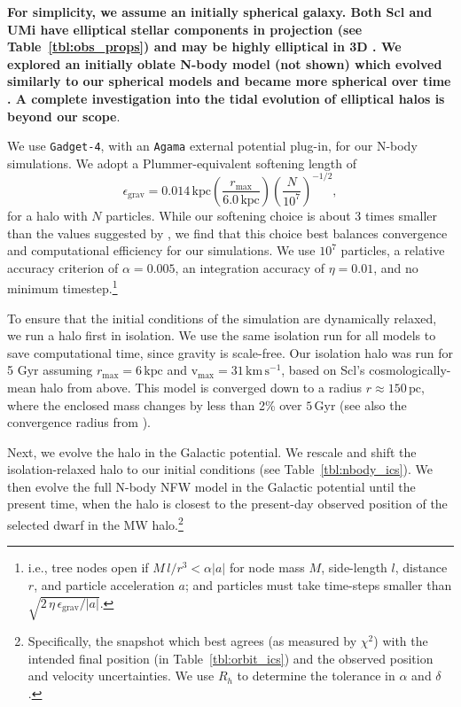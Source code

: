 \documentclass[linenumbers, twocolumn, twocolappendix]{aastex701}
\newcommand{\V}{\textrm{v}}
\newcommand{\vmax}{\V_\text{max}}
\newcommand{\rmax}{r_\text{max}}
\newcommand{\kpc}{\text{kpc}}
\newcommand{\Gyr}{\text{Gyr}}
\newcommand{\kms}{\mathrm{km\,s^{-1}}}
\newcommand{\agama}{\texttt{Agama}}
\newcommand{\gadget}{\texttt{Gadget-4}}
\providecommand{\DIFadd}[1]{{\bf #1}} %
\providecommand{\DIFaddend}{} %
\begin{document}
\DIFadd{For simplicity, we assume an initially spherical galaxy. Both Scl and UMi have elliptical stellar components in projection (see Table~\ref{tbl:obs_props}) and may be highly elliptical in 3D \citep[e.g.,][]{an+koposov2022}. We explored an initially oblate N-body model (not shown) which evolved similarly to our spherical models and became more spherical over time \citep[see also][]{battaglia+sollima+nipoti2015}. A complete investigation into the tidal evolution of elliptical halos is beyond our scope}\DIFaddend . 


We use \gadget{}, with an \agama{} external potential plug-in, for our N-body simulations. 
We adopt a Plummer-equivalent softening length of
\begin{equation}\label{eq:softening_length}
    \epsilon_\text{grav} = 0.014\,\text{kpc}\left(\frac{r_\text{max}}{6.0\,\text{kpc}}\right)\left(\frac{N}{10^7}\right)^{-1/2},
\end{equation} 
for a halo with $N$ particles. While our softening choice is about 3 times smaller than the values suggested by \citet{power+2003}, we find that this choice best balances convergence and computational efficiency for our simulations.
We use $10^7$ particles, a relative accuracy criterion of $\alpha=0.005$, an integration accuracy of $\eta=0.01$, and no minimum timestep.\footnote{i.e., tree nodes open if $M\,l/r^3 < \alpha |a|$ for node mass $M$, side-length $l$, distance $r$, and particle acceleration $a$; and particles must take time-steps smaller than $\sqrt{2\,\eta\,\epsilon_\text{grav} / |a|}$.}

To ensure that the initial conditions of the simulation are dynamically
relaxed, we run a halo first in isolation. We use the same isolation run for all models to save computational time, since gravity is scale-free. Our isolation halo was run for 5 Gyr assuming $\rmax=6\,\kpc$ and $\vmax=31\,\kms$, based on Scl's cosmologically-mean halo from above.
This model is converged down to a radius $r\approx 150\,\text{pc}$, where the enclosed mass changes by less than 2\% over $5\,\Gyr$ (see also the convergence radius from \citealt{power+2003}).

Next, we evolve the halo in the Galactic potential. We rescale and shift the
isolation-relaxed halo to our initial conditions (see Table~\ref{tbl:nbody_ics}). 
We then evolve the full N-body NFW model in the Galactic
potential until the present time, when the halo is closest to the present-day observed position of the selected dwarf in the MW
halo.\footnote{Specifically, the snapshot which best agrees (as measured
  by $\chi^2$) with the intended final position (in
  Table~\ref{tbl:orbit_ics}) and the observed position and velocity
  uncertainties. We use $R_h$ to determine the tolerance in $\alpha$ and
  $\delta$.}
\end{document}
